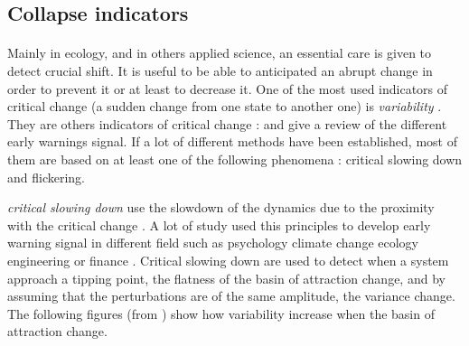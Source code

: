 \documentclass{article}
\begin{document}



\subsection{Collapse indicators}

\paragraph{}
Mainly in ecology, and in others applied science, an essential care is given to detect crucial shift. It is useful to be able to anticipated an abrupt change in order to prevent it or at least to decrease it. One of the most used indicators of critical change (a sudden change from one state to another one) is \textit{variability} \citep{brock_variance_2006, carpenter2006rising, scheffer2015generic, dakos_robustness_2012, biggs_turning_2009}. They are others indicators of critical change :  \cite{scheffer_generic_2015} and \cite{dakos_methods_2012} give a review of the different early warnings signal. If a lot of different methods have been established, most of them are based on at least one of the following phenomena : critical slowing down and flickering.

\textit{critical slowing down} use the slowdown of the dynamics due to the proximity with the critical change \citep{dakos_critical_2014, dakos_slowing_nodate, scheffer_anticipating_2012}. A lot of study used this principles to develop early warning signal in different field such as psychology \citep{van_de_leemput_critical_2014} climate change \citep{lenton_early_2012} ecology \citep{chisholm_critical_2009, gandhi_critical_1998} engineering \citep{ren_early_2015} or finance \citep{diks_critical_2018}. Critical slowing down are used to detect when a system approach a tipping point, the flatness of the basin of attraction change, and by assuming that the perturbations are of the same amplitude, the variance change. The following figures (from \cite{lenton_early_2012}) show how variability increase when the basin of attraction change.
\end{document}
